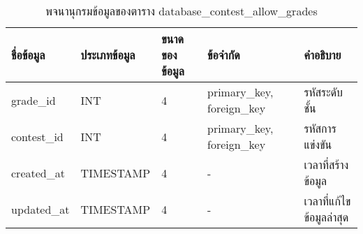 \begin{table}[H]
    \caption{พจนานุกรมข้อมูลของตาราง database\_contest\_allow\_grades}
    \label{tab:database-contest-allow_grades}
    \begin{tabularx}{\textwidth}{ | p{2.25cm} | p{2.20cm} | p{2.45cm} | p{2cm} | X | }
    \hline
    \textbf{ชื่อข้อมูล} & \textbf{ประเภทข้อมูล} & \textbf{ขนาดของข้อมูล} & \textbf{ข้อจำกัด} & \textbf{คำอธิบาย} \\
    \hline
    grade\_id & INT & 4 & primary\_key, foreign\_key & รหัสระดับชั้น \\
    \hline
    contest\_id & INT & 4 & primary\_key, foreign\_key & รหัสการแข่งขัน \\
    \hline
    created\_at & TIMESTAMP & 4 & - & เวลาที่สร้างข้อมูล \\
    \hline
    updated\_at & TIMESTAMP & 4 & - & เวลาที่แก้ไขข้อมูลล่าสุด \\
    \hline
    \end{tabularx}
\end{table}